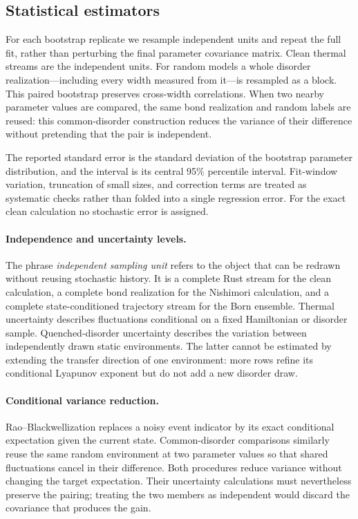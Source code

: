 \documentclass[aps,prb,reprint,superscriptaddress,longbibliography,floatfix]{revtex4-2}
\begin{document}
\subsection{Statistical estimators}
\label{sec:statistical-estimators}

For each bootstrap replicate we resample independent units and repeat the full
fit, rather than perturbing the final parameter covariance matrix.  Clean
thermal streams are the independent units.  For random models a whole disorder
realization---including every width measured from it---is resampled as a
block.  This paired bootstrap \cite{EfronTibshirani1993} preserves
cross-width correlations.  When two nearby parameter values are compared, the
same bond realization and random labels are reused: this common-disorder
construction reduces the variance of their difference without pretending that
the pair is independent.

The reported standard error is the standard deviation of the bootstrap
parameter distribution, and the interval is its central 95\% percentile
interval.  Fit-window variation, truncation of small sizes, and correction
terms are treated as systematic checks rather than folded into a single
regression error.  For the exact clean calculation no stochastic error is
assigned.

\paragraph{Independence and uncertainty levels.}
The phrase \emph{independent sampling unit} refers to the object that can be
redrawn without reusing stochastic history.  It is a complete Rust stream for
the clean calculation, a complete bond realization for the Nishimori
calculation, and a complete state-conditioned trajectory stream for the Born
ensemble.  Thermal uncertainty describes fluctuations conditional on a fixed
Hamiltonian or disorder sample.  Quenched-disorder uncertainty describes the
variation between independently drawn static environments.  The latter
cannot be estimated by extending the transfer direction of one environment:
more rows refine its conditional Lyapunov exponent but do not add a new
disorder draw.

\paragraph{Conditional variance reduction.}
Rao--Blackwellization replaces a noisy event indicator by its exact
conditional expectation given the current state.  Common-disorder
comparisons similarly reuse the same random environment at two parameter
values so that shared fluctuations cancel in their difference.  Both
procedures reduce variance without changing the target expectation.  Their
uncertainty calculations must nevertheless preserve the pairing; treating
the two members as independent would discard the covariance that produces
the gain.
\end{document}

